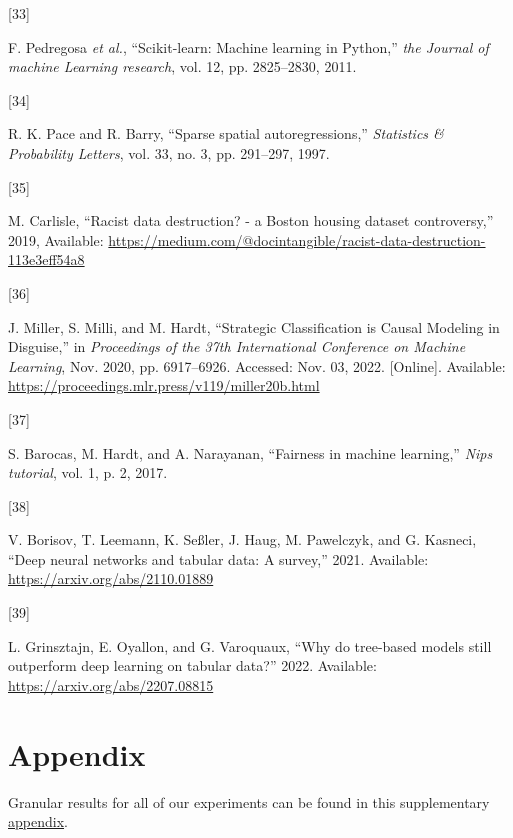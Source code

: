 \documentclass[conference,final,]{IEEEtran}
\newlength{\cslhangindent}
\newlength{\csllabelwidth}
\newlength{\cslentryspacingunit} %
\newenvironment{CSLReferences}[2] %
 {%
  \setlength{\parindent}{0pt}
  \ifodd #1
  \let\oldpar\par
  \def\par{\hangindent=\cslhangindent\oldpar}
  \fi
  \setlength{\parskip}{#2\cslentryspacingunit}
 }%
 {}
\newcommand{\CSLLeftMargin}[1]{\parbox[t]{\csllabelwidth}{#1}}
\newcommand{\CSLRightInline}[1]{\parbox[t]{\linewidth - \csllabelwidth}{#1}\break}
\theoremstyle{definition}
\theoremstyle{definition}
\theoremstyle{definition}
\theoremstyle{definition}
\theoremstyle{remark}
\begin{document}
\begin{CSLReferences}{0}{0}
\leavevmode{}%
\CSLLeftMargin{{[}33{]} }%
\CSLRightInline{F. Pedregosa \emph{et al.}, {``Scikit-learn: {Machine} learning in {Python},''} \emph{the Journal of machine Learning research}, vol. 12, pp. 2825--2830, 2011.}

\leavevmode{}%
\CSLLeftMargin{{[}34{]} }%
\CSLRightInline{R. K. Pace and R. Barry, {``Sparse spatial autoregressions,''} \emph{Statistics \& Probability Letters}, vol. 33, no. 3, pp. 291--297, 1997.}

\leavevmode{}%
\CSLLeftMargin{{[}35{]} }%
\CSLRightInline{M. Carlisle, {``Racist data destruction? - a {Boston} housing dataset controversy,''} 2019, Available: \url{https://medium.com/@docintangible/racist-data-destruction-113e3eff54a8}}

\leavevmode{}%
\CSLLeftMargin{{[}36{]} }%
\CSLRightInline{J. Miller, S. Milli, and M. Hardt, {``Strategic {Classification} is {Causal Modeling} in {Disguise},''} in \emph{Proceedings of the 37th {International Conference} on {Machine Learning}}, Nov. 2020, pp. 6917--6926. Accessed: Nov. 03, 2022. {[}Online{]}. Available: \url{https://proceedings.mlr.press/v119/miller20b.html}}

\leavevmode{}%
\CSLLeftMargin{{[}37{]} }%
\CSLRightInline{S. Barocas, M. Hardt, and A. Narayanan, {``Fairness in machine learning,''} \emph{Nips tutorial}, vol. 1, p. 2, 2017.}

\leavevmode{}%
\CSLLeftMargin{{[}38{]} }%
\CSLRightInline{V. Borisov, T. Leemann, K. Seßler, J. Haug, M. Pawelczyk, and G. Kasneci, {``Deep neural networks and tabular data: {A} survey,''} 2021. Available: \url{https://arxiv.org/abs/2110.01889}}

\leavevmode{}%
\CSLLeftMargin{{[}39{]} }%
\CSLRightInline{L. Grinsztajn, E. Oyallon, and G. Varoquaux, {``Why do tree-based models still outperform deep learning on tabular data?''} 2022. Available: \url{https://arxiv.org/abs/2207.08815}}

\end{CSLReferences}

\hypertarget{appendix}{%
\section{Appendix}\label{appendix}}

Granular results for all of our experiments can be found in this supplementary \href{https://anonymous.4open.science/r/AlgorithmicRecourseDynamics/build/dev/notebooks/appendix.html}{appendix}.
\end{document}
